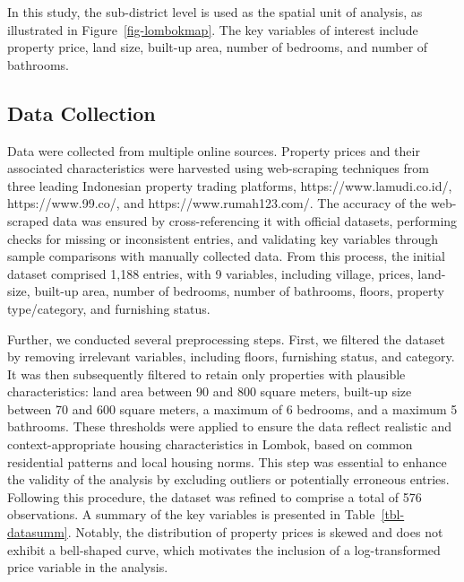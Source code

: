 \documentclass[
  default,
]{sn-jnl}
\begin{document}
In this study, the sub-district level is used as the spatial unit of
analysis, as illustrated in Figure~\ref{fig-lombokmap}. The key
variables of interest include property price, land size, built-up area,
number of bedrooms, and number of bathrooms.

\subsection{Data Collection}\label{data-collection}

Data were collected from multiple online sources. Property prices and
their associated characteristics were harvested using web-scraping
techniques from three leading Indonesian property trading platforms,
https://www.lamudi.co.id/, https://www.99.co/, and
https://www.rumah123.com/. The accuracy of the web-scraped data was
ensured by cross-referencing it with official datasets, performing
checks for missing or inconsistent entries, and validating key variables
through sample comparisons with manually collected data. From this
process, the initial dataset comprised 1,188 entries, with 9 variables,
including village, prices, land-size, built-up area, number of bedrooms,
number of bathrooms, floors, property type/category, and furnishing
status.

Further, we conducted several preprocessing steps. First, we filtered
the dataset by removing irrelevant variables, including floors,
furnishing status, and category. It was then subsequently filtered to
retain only properties with plausible characteristics: land area between
90 and 800 square meters, built-up size between 70 and 600 square
meters, a maximum of 6 bedrooms, and a maximum 5 bathrooms. These
thresholds were applied to ensure the data reflect realistic and
context-appropriate housing characteristics in Lombok, based on common
residential patterns and local housing norms. This step was essential to
enhance the validity of the analysis by excluding outliers or
potentially erroneous entries. Following this procedure, the dataset was
refined to comprise a total of 576 observations. A summary of the key
variables is presented in Table~\ref{tbl-datasumm}. Notably, the
distribution of property prices is skewed and does not exhibit a
bell-shaped curve, which motivates the inclusion of a log-transformed
price variable in the analysis.

\begingroup\fontsize{9}{11}\selectfont
\end{document}
